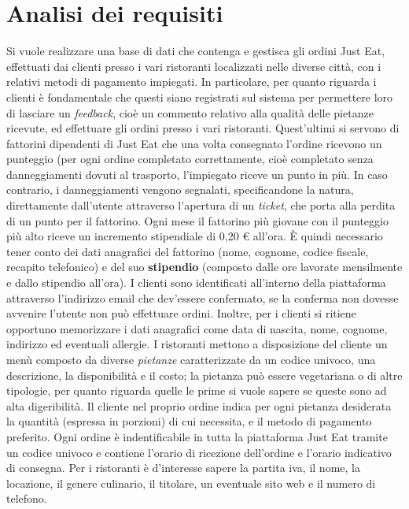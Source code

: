\documentclass[10pt]{article}
\begin{document}
	\section{Analisi dei requisiti}
	Si vuole realizzare una base di dati che contenga e gestisca gli ordini Just Eat\texttrademark{}, effettuati dai clienti presso i vari ristoranti localizzati nelle diverse citt\`a, con i relativi metodi di pagamento impiegati. In particolare, per quanto riguarda i clienti \`e fondamentale che questi siano registrati sul sistema per permettere loro di lasciare un \textit{feedback}, cio\`e un commento relativo alla qualità delle pietanze ricevute, ed effettuare gli ordini presso i vari ristoranti. Quest'ultimi si servono di fattorini\footnotemark{} dipendenti di Just Eat\texttrademark{} che una volta consegnato l'ordine ricevono un punteggio (per ogni ordine completato correttamente, cio\`e completato senza danneggiamenti dovuti al trasporto, l'impiegato riceve un punto in più. In caso contrario, i danneggiamenti vengono segnalati, specificandone la natura, direttamente dall'utente attraverso l'apertura di un \textit{ticket}, che porta alla perdita di un punto per il fattorino. Ogni mese il fattorino più giovane con il punteggio più alto riceve un incremento stipendiale di 0,20 \euro{} all'ora. \`E quindi necessario tener conto dei dati anagrafici del fattorino (nome, cognome, codice fiscale, recapito telefonico) e del suo \textbf{stipendio} (composto dalle ore lavorate mensilmente e dallo stipendio all'ora). I clienti sono identificati all'interno della piattaforma attraverso l'indirizzo email che dev'essere confermato, se la conferma non dovesse avvenire l'utente non può effettuare ordini. Inoltre, per i clienti si ritiene opportuno memorizzare i dati anagrafici come data di nascita, nome, cognome, indirizzo ed eventuali allergie. I ristoranti mettono a disposizione del cliente un men\`u composto da diverse \textit{pietanze} caratterizzate da un codice univoco, una descrizione, la disponibilità e il costo; la pietanza può essere vegetariana o di altre tipologie, per quanto riguarda quelle le prime si vuole sapere se queste sono ad alta digeribilità. Il cliente nel proprio ordine indica per ogni pietanza desiderata la quantità (espressa in porzioni) di cui necessita, e il metodo di pagamento preferito. Ogni ordine \`e indentificabile in tutta la piattaforma Just Eat\texttrademark{} tramite un codice univoco e contiene l'orario di ricezione dell'ordine e l'orario indicativo di consegna. Per i ristoranti è d'interesse sapere la partita iva, il nome, la locazione, il genere culinario, il titolare, un eventuale sito web e il numero di telefono.
\end{document}
